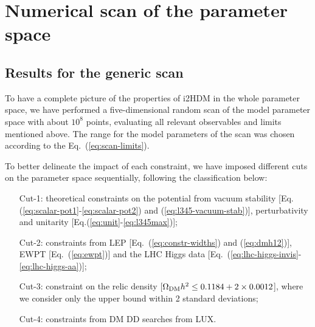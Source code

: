 \section{Numerical scan of the parameter space}

\subsection{Results for the generic scan}
To have a complete picture of the properties of i2HDM in the whole parameter space, we have performed a
five-dimensional random scan of the model parameter space with about $10^8$ points, evaluating all relevant
observables and limits mentioned above. The range for 
the model parameters of the scan was chosen according to the Eq.~(\ref{eq:scan-limits}).



To better delineate the impact of each constraint, we have imposed different cuts on the parameter space sequentially, 
following the classification below:
\begin{itemize}
\item[Cut-1:] theoretical constraints on the potential from vacuum stability 
[Eq.(\ref{eq:scalar-pot1}-\ref{eq:scalar-pot2}) and (\ref{eq:l345-vacuum-stab})], perturbativity  and
unitarity [Eq.(\ref{eq:unit}-\ref{eq:l345max})];
\item[Cut-2:] constraints from LEP [Eq.~(\ref{eq:constr-widths}) and (\ref{eq:dmh12})], EWPT
[Eq.~(\ref{eq:ewpt})] and the LHC Higgs data
[Eq.~(\ref{eq:lhc-higgs-invis}-\ref{eq:lhc-higgs-aa})];
\item[Cut-3:] constraint on the relic
density  [$\Omega_{\rm DM} h^2 \le 0.1184+2\times 0.0012$], where we consider only the upper bound within 2 standard deviations;
\item[Cut-4:] constraints from DM DD searches from LUX.
\end{itemize}


